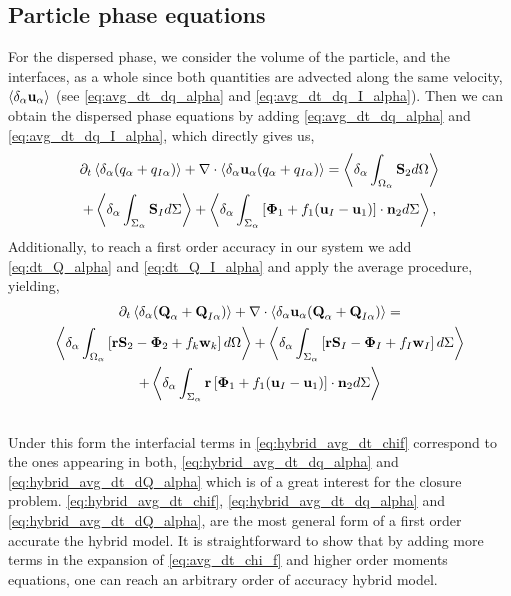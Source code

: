 \subsection{Particle phase equations}
For the dispersed phase, we consider the volume of the particle, and the interfaces, as a whole since both quantities are advected along the same velocity, $\left<\delta_\alpha \textbf{u}_\alpha\right>$ (see \ref{eq:avg_dt_dq_alpha} and \ref{eq:avg_dt_dq_I_alpha}).
Then we can obtain the dispersed phase equations by adding \ref{eq:avg_dt_dq_alpha} and \ref{eq:avg_dt_dq_I_alpha}, which directly gives us, 
\begin{multline}
    \partial_t \left<\delta_\alpha (q_\alpha+q_{I\alpha})\right>
    + \mathbf{\nabla} \cdot\left<\delta_\alpha \textbf{u}_\alpha (q_\alpha+q_{I\alpha})\right>
    = \left<\delta_\alpha \int_{\Omega_\alpha} \textbf{S}_2 d\Omega\right>\\
    + \left<\delta_\alpha \int_{\Sigma_\alpha} \textbf{S}_I d\Sigma\right>
    + \left<\delta_\alpha \int_{\Sigma_\alpha} \left[\mathbf{\Phi}_1 + f_1 (\textbf{u}_I-\textbf{u}_1) \right] \cdot \textbf{n}_2 d\Sigma\right>,
    \label{eq:hybrid_avg_dt_dq_alpha}\\
\end{multline}
Additionally, to reach a first order accuracy in our system we add \ref{eq:dt_Q_alpha} and \ref{eq:dt_Q_I_alpha} and apply the average procedure, yielding,
\begin{multline}
    \partial_t \left<\delta_\alpha (\textbf{Q}_\alpha+\textbf{Q}_{I\alpha})\right>
    + \mathbf{\nabla}\cdot \left<\delta_\alpha   \textbf{u}_\alpha (\textbf{Q}_\alpha+ \textbf{Q}_{I\alpha})\right>
    =\\ \left<\delta_\alpha \int_{\Omega_\alpha} \left[
        \textbf{r}\textbf{S}_2
        - \mathbf{\Phi}_2
        + f_k\textbf{w}_k
        \right] d\Omega\right>
    + \left<\delta_\alpha \int_{\Sigma_\alpha} \left[
        \textbf{r}\textbf{S}_I
        - \mathbf{\Phi}_I
        + f_I\textbf{w}_I
    \right] d\Sigma\right>\\
    + \left<\delta_\alpha \int_{\Sigma_\alpha} \textbf{r}\left[\mathbf{\Phi}_1 + f_1 (\textbf{u}_I-\textbf{u}_1) \right] \cdot \textbf{n}_2 d\Sigma\right>\\
    \label{eq:hybrid_avg_dt_dQ_alpha}\\
\end{multline}
Under this form the interfacial terms in \ref{eq:hybrid_avg_dt_chif} correspond to the ones appearing in both, \ref{eq:hybrid_avg_dt_dq_alpha} and \ref{eq:hybrid_avg_dt_dQ_alpha} which is of a great interest for the closure problem. 
\ref{eq:hybrid_avg_dt_chif}, \ref{eq:hybrid_avg_dt_dq_alpha} and \ref{eq:hybrid_avg_dt_dQ_alpha},  are the most general form of a first order accurate the hybrid model. 
It is straightforward to show that by adding more terms in the expansion of \ref{eq:avg_dt_chi_f} and higher order moments equations, one can reach an arbitrary order of accuracy hybrid model. 

